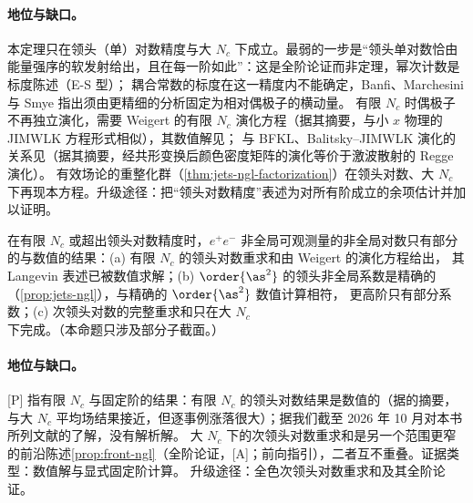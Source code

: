 \paragraph{地位与缺口。}
本定理只在领头（单）对数精度与大 $N_c$ 下成立。最弱的一步是“领头单对数恰由能量强序的软发射给出，且在每一阶如此”：这是全阶论证而非定理，幂次计数是标度陈述（E-S 型）；
耦合常数的标度在这一精度内不能确定，Banfi、Marchesini 与 Smye 指出须由更精细的分析固定为相对偶极子的横动量\cite[第~4~节]{Banfi:2002hw}。
有限 $N_c$ 时偶极子不再独立演化，需要 Weigert 的有限 $N_c$ 演化方程\cite{Weigert:2003mm}（据其摘要，与小 $x$ 物理的 JIMWLK 方程形式相似），其数值解见\cite{Hatta:2013iba}；
与 BFKL、Balitsky--JIMWLK 演化的关系见\cite{Caron-Huot:2015bja}（据其摘要，经共形变换后颜色密度矩阵的演化等价于激波散射的 Regge 演化）。
有效场论的重整化群（\cref{thm:jets-ngl-factorization}）在领头对数、大 $N_c$ 下再现本方程\cite{Becher:2016mmh}。升级途径：把“领头对数精度”表述为对所有阶成立的余项估计并加以证明。

\begin{proposition}\label{prop:jets-ngl-beyond}
在有限 $N_c$ 或超出领头对数精度时，$e^+e^-$ 非全局可观测量的非全局对数只有部分的与数值的结果：(a) 有限 $N_c$ 的领头对数重求和由 Weigert 的演化方程给出\cite{Weigert:2003mm}，
其 Langevin 表述已被数值求解\cite{Hatta:2013iba}；(b) $\order{\as^2}$ 的领头非全局系数是精确的（\cref{prop:jets-ngl}），与精确的 $\order{\as^2}$ 数值计算相符\cite[第~4~节]{DasguptaSalam2001}，
更高阶只有部分系数；(c) 次领头对数的完整重求和只在大 $N_c$ 下完成。（本命题只涉及部分子截面。）
\end{proposition}

\paragraph{地位与缺口。}
[P] 指有限 $N_c$ 与固定阶的结果：有限 $N_c$ 的领头对数结果是数值的（据\cite{Hatta:2013iba}的摘要，与大 $N_c$ 平均场结果接近，但逐事例涨落很大）；据我们截至 2026 年 10 月对本书所列文献的了解，没有解析解。
大 $N_c$ 下的次领头对数重求和是另一个范围更窄的前沿陈述\cref{prop:front-ngl}（全阶论证，[A]；前向指引），二者互不重叠。证据类型：数值解与显式固定阶计算。
升级途径：全色次领头对数重求和及其全阶论证。

